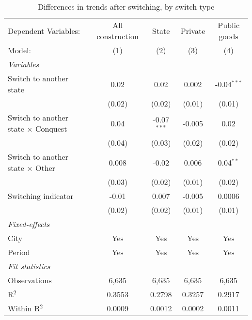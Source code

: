 \begin{table}[htbp]
   \caption{\label{tab:window_50y} Differences in trends after switching, by switch type}
   \centering
   \begin{tabular}{lcccc}
      \tabularnewline \midrule \midrule
      Dependent Variables:                       & All construction & State         & Private & Public goods\\  
      Model:                                     & (1)              & (2)           & (3)     & (4)\\  
      \midrule
      \emph{Variables}\\
      Switch to another state                    & 0.02             & 0.02          & 0.002   & -0.04$^{***}$\\   
                                                 & (0.02)           & (0.02)        & (0.01)  & (0.01)\\   
      Switch to another state $\times$ Conquest  & 0.04             & -0.07$^{***}$ & -0.005  & 0.02\\   
                                                 & (0.04)           & (0.03)        & (0.02)  & (0.02)\\   
      Switch to another state $\times$ Other     & 0.008            & -0.02         & 0.006   & 0.04$^{**}$\\   
                                                 & (0.03)           & (0.02)        & (0.01)  & (0.02)\\   
      Switching indicator                        & -0.01            & 0.007         & -0.005  & 0.0006\\   
                                                 & (0.02)           & (0.02)        & (0.01)  & (0.01)\\   
      \midrule
      \emph{Fixed-effects}\\
      City                                       & Yes              & Yes           & Yes     & Yes\\  
      Period                                     & Yes              & Yes           & Yes     & Yes\\  
      \midrule
      \emph{Fit statistics}\\
      Observations                               & 6,635            & 6,635         & 6,635   & 6,635\\  
      R$^2$                                      & 0.3553           & 0.2798        & 0.3257  & 0.2917\\  
      Within R$^2$                               & 0.0009           & 0.0012        & 0.0002  & 0.0011\\  
      \midrule \midrule
      

\end{tabular}
\end{table}
